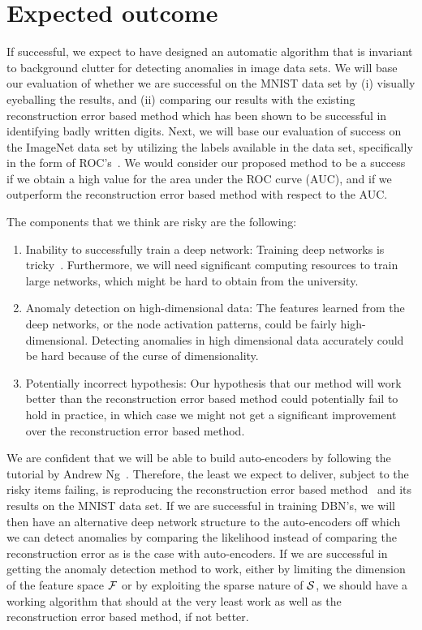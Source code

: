 \documentclass[10pt,twocolumn,letterpaper]{article}
\begin{document}
\section{Expected outcome}
If successful, we expect to have designed an automatic algorithm that is invariant to background clutter for detecting anomalies in image data sets. We will base our evaluation of whether we are successful on the MNIST data set by (i) visually eyeballing the results, and (ii) comparing our results with the existing reconstruction error based method which has been shown to be successful in identifying badly written digits. Next, we will base our evaluation of success on the ImageNet data set by utilizing the labels available in the data set, specifically in the form of ROC's~\cite{roc}. We would consider our proposed method to be a success if we obtain a high value for the area under the ROC curve (AUC), and if we outperform the reconstruction error based method with respect to the AUC.

The components that we think are risky are the following:
\vspace{-0.1in}
\begin{enumerate}
\item Inability to successfully train a deep network: Training deep networks is tricky~\cite{tricky}. Furthermore, we will need significant computing resources to train large networks, which might be hard to obtain from the university.
\item Anomaly detection on high-dimensional data: The features learned from the deep networks, or the node activation patterns, could be fairly high-dimensional. Detecting anomalies in high dimensional data accurately could be hard because of the curse of dimensionality. 
\item Potentially incorrect hypothesis: Our hypothesis that our method will work better than the reconstruction error based method could potentially fail to hold in practice, in which case we might not get a significant improvement over the reconstruction error based method.
\end{enumerate}

We are confident that we will be able to build auto-encoders by following the tutorial by Andrew Ng~\cite{ufldl}. Therefore, the least we expect to deliver, subject to the risky items failing, is reproducing the reconstruction error based method~\cite{h2o} and its results on the MNIST data set. If we are successful in training DBN's, we will then have an alternative deep network structure to the auto-encoders off which we can detect anomalies by comparing the likelihood instead of comparing the reconstruction error as is the case with auto-encoders. If we are successful in getting the anomaly detection method to work, either by limiting the dimension of the feature space ${\cal{F}}$ or by exploiting the sparse nature of ${\cal{S}}$, we should have a working algorithm that should at the very least work as well as the reconstruction error based method, if not better.
\end{document}
